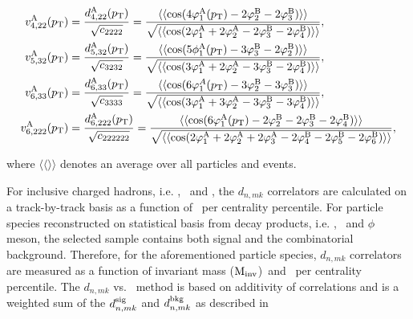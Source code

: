 \begin{align}
v_{4,22}^{\rm{A}}(p_{\rm{T}}) &= \frac{d_{4,22}^{\rm{A}}(p_{\rm{T}})}{\sqrt{c_{2222}}} =  \frac{\langle\langle \cos(4\varphi^{\rm{A}}_{1}(p_{\rm{T}})-2\varphi^{\rm{B}}_{2}-2\varphi^{\rm{B}}_{3})\rangle\rangle}{\sqrt{\langle\langle \cos(2\varphi^{\rm{A}}_{1}+2\varphi^{\rm{A}}_{2}-2\varphi^{\rm{B}}_{3}-2\varphi^{\rm{B}}_{4}) \rangle\rangle}}, \label{Eq:VA422} \\
v_{5,32}^{\rm{A}}(p_{\rm{T}}) &= \frac{d_{5,32}^{\rm{A}}(p_{\rm{T}})}{\sqrt{c_{3232}}} = \frac{\langle\langle \cos(5\phi^{\rm{A}}_{1}(p_{\rm{T}})-3\varphi^{\rm{B}}_{3}-2\varphi^{\rm{B}}_{2})\rangle\rangle}{\sqrt{\langle\langle \cos(3\varphi^{\rm{A}}_{1}+2\varphi^{\rm{A}}_{2}-3\varphi^{\rm{B}}_{3}-2\varphi^{\rm{B}}_{4}) \rangle\rangle}}, \label{Eq:VA532}\\
v_{6,33}^{\rm{A}}(p_{\rm{T}}) &= \frac{d_{6,33}^{\rm{A}}(p_{\rm{T}})}{\sqrt{c_{3333}}} =\frac{\langle\langle \cos(6\varphi^{A}_{1}(p_{\rm{T}})-3\varphi^{\rm{B}}_{2}-3\varphi^{\rm{B}}_{3})\rangle\rangle}{\sqrt{\langle\langle \cos(3\varphi^{\rm{A}}_{1}+3\varphi^{\rm{A}}_{2}-3\varphi^{\rm{B}}_{3}-3\varphi^{\rm{B}}_{4}) \rangle\rangle}}, \label{Eq:VA633}\\
v_{6,222}^{\rm{A}}(p_{\rm{T}}) &= \frac{d_{6,222}^{\rm{A}}(p_{\rm{T}})}{\sqrt{c_{222222}}} =\frac{\langle\langle \cos(6\varphi^{\rm{A}}_{1}(p_{\rm{T}})-2\varphi^{\rm{B}}_{2}-2\varphi^{\rm{B}}_{3}-2\varphi^{\rm{B}}_{4})\rangle\rangle}{\sqrt{\langle\langle \cos(2\varphi^{\rm{A}}_{1}+2\varphi^{\rm{A}}_{2}+2\varphi^{\rm{A}}_{3}-2\varphi^{\rm{B}}_{4}-2\varphi^{\rm{B}}_{5}-2\varphi^{\rm{B}}_{6}) \rangle\rangle}},
\label{Eq:VA6222}
\end{align}

where $\langle\langle\rangle\rangle$ denotes an average over all particles and events.


For inclusive charged hadrons, i.e. \pion, \kaon~and \proton, the $d_{n,mk}$ correlators are calculated on a track-by-track basis as a function of \pT~per centrality percentile. For particle species reconstructed on statistical basis from decay products, i.e. \Ks, \lambdas~and $\phi$ meson, the selected sample contains both signal and the combinatorial background. Therefore, for the aforementioned particle species, $d_{n,mk}$ correlators are measured as a function of invariant mass (${\rm M_{inv}}$)~and \pT~per centrality percentile. The $d_{n,mk}$ vs. \minv~method is based on additivity of correlations and is a weighted sum of the $d_{n,mk}^{\rm{sig}}$ and $d_{n,mk}^{\rm{bkg}}$ as described in

